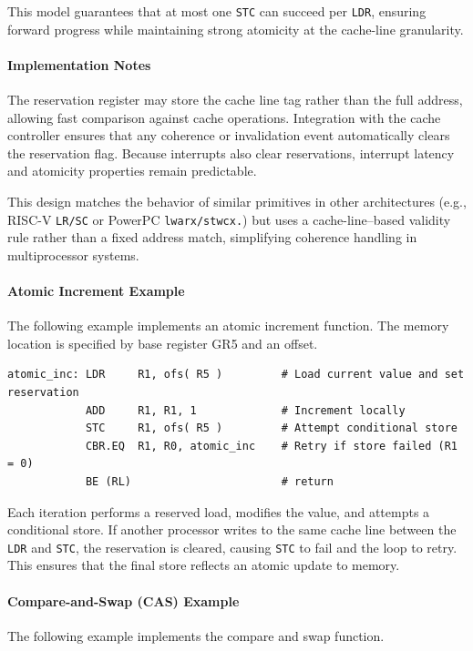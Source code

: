 This model guarantees that at most one \texttt{STC} can succeed per \texttt{LDR}, ensuring forward progress while maintaining strong atomicity at the cache-line granularity.

\paragraph{Implementation Notes}

The reservation register may store the cache line tag rather than the full address, allowing fast comparison against cache operations. Integration with the cache controller ensures that any coherence or invalidation event automatically clears the reservation flag. Because interrupts also clear reservations, interrupt latency and atomicity properties remain predictable.

This design matches the behavior of similar primitives in other architectures (e.g., RISC-V \texttt{LR/SC} or PowerPC \texttt{lwarx/stwcx.}) but uses a cache-line–based validity rule rather than a fixed address match, simplifying coherence handling in multiprocessor systems.

\paragraph{Atomic Increment Example}

The following example implements an atomic increment function. The memory location is specified by base register GR5 and an offset. \\

\begin{lstlisting}[style=iPageOpStyle]
atomic_inc:	LDR 	R1, ofs( R5 )         # Load current value and set reservation
    		ADD     R1, R1, 1             # Increment locally
    		STC     R1, ofs( R5 )         # Attempt conditional store
    		CBR.EQ  R1, R0, atomic_inc    # Retry if store failed (R1 = 0)
    		BE (RL)                       # return
\end{lstlisting}

Each iteration performs a reserved load, modifies the value, and attempts a conditional store. If another processor writes to the same cache line between the \texttt{LDR} and \texttt{STC}, the reservation is cleared, causing \texttt{STC} to fail and the loop to retry. This ensures that the final store reflects an atomic update to memory.

\paragraph{Compare-and-Swap (CAS) Example}
The following example implements the compare and swap function. \\

